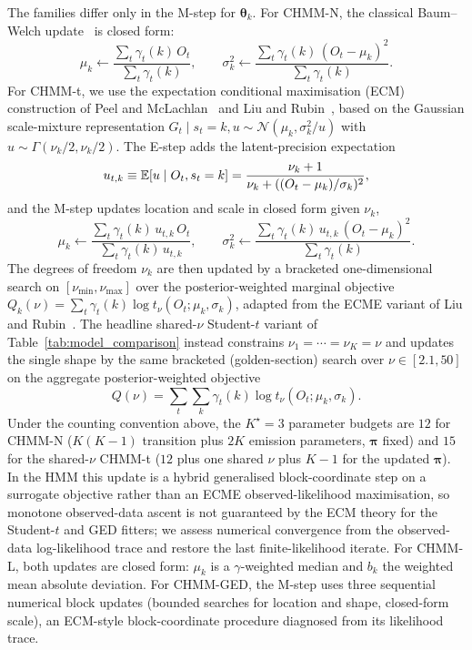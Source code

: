 The families differ only in the M-step for $\boldsymbol\theta_k$. For CHMM-N, the classical Baum--Welch update~\cite{baum1970maximization} is closed form:
\[
\mu_k \leftarrow \frac{\sum_t \gamma_t(k)\, O_t}{\sum_t \gamma_t(k)},
\qquad
\sigma_k^2 \leftarrow \frac{\sum_t \gamma_t(k)\, (O_t - \mu_k)^2}{\sum_t \gamma_t(k)}.
\] For CHMM-t, we use the expectation conditional maximisation (ECM) construction of Peel and McLachlan~\cite{peel2000robust} and Liu and Rubin~\cite{liu1995ml}, based on the Gaussian scale-mixture representation $G_t \mid s_t = k, u \sim \mathcal{N}(\mu_k, \sigma_k^2/u)$ with $u \sim \Gamma(\nu_k/2, \nu_k/2)$. The E-step adds the latent-precision expectation
\begin{equation}
    u_{t,k} \equiv \mathbb{E}[u \mid O_t, s_t = k] = \frac{\nu_k + 1}{\nu_k + ((O_t - \mu_k)/\sigma_k)^2},
    \label{eq:tprecision}
\end{equation}
and the M-step updates location and scale in closed form given $\nu_k$,
\begin{equation}
    \mu_k \leftarrow \frac{\sum_t \gamma_t(k)\, u_{t,k}\, O_t}{\sum_t \gamma_t(k)\, u_{t,k}},
    \qquad
    \sigma_k^2 \leftarrow \frac{\sum_t \gamma_t(k)\, u_{t,k}\, (O_t - \mu_k)^2}{\sum_t \gamma_t(k)}.
    \label{eq:tupdate}
\end{equation}
The degrees of freedom $\nu_k$ are then updated by a bracketed one-dimensional search on $[\nu_{\min}, \nu_{\max}]$ over the posterior-weighted marginal objective $Q_k(\nu) = \sum_t \gamma_t(k) \log t_\nu(O_t; \mu_k, \sigma_k)$, adapted from the ECME variant of Liu and Rubin~\cite{liu1995ml}. The headline shared-$\nu$ Student-$t$ variant of Table~\ref{tab:model_comparison} instead constrains $\nu_1 = \cdots = \nu_K = \nu$ and updates the single shape by the same bracketed (golden-section) search over $\nu \in [2.1, 50]$ on the aggregate posterior-weighted objective
\[
Q(\nu) = \textstyle\sum_{t}\sum_{k} \gamma_t(k) \log t_\nu(O_t; \mu_k, \sigma_k).
\] Under the counting convention above, the $K^\star = 3$ parameter budgets are $12$ for CHMM-N ($K(K-1)$ transition plus $2K$ emission parameters, $\boldsymbol\pi$ fixed) and $15$ for the shared-$\nu$ CHMM-t ($12$ plus one shared $\nu$ plus $K - 1$ for the updated $\boldsymbol\pi$). In the HMM this update is a hybrid generalised block-coordinate step on a surrogate objective rather than an ECME observed-likelihood maximisation, so monotone observed-data ascent is not guaranteed by the ECM theory for the Student-$t$ and GED fitters; we assess numerical convergence from the observed-data log-likelihood trace and restore the last finite-likelihood iterate. For CHMM-L, both updates are closed form: $\mu_k$ is a $\gamma$-weighted median and $b_k$ the weighted mean absolute deviation. For CHMM-GED, the M-step uses three sequential numerical block updates (bounded searches for location and shape, closed-form scale), an ECM-style block-coordinate procedure diagnosed from its likelihood trace.
